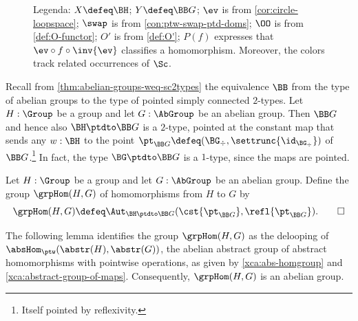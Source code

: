 \def\Scc{\inred{\Sc}}
\begin{figure}[h]
  \caption{\label{fig:bjørn}
  Legenda:
  $X\defeq\BH$;
  $Y\defeq\protect\BB G$;
  $\protect\ev$ is from \cref{cor:circle-loopspace};
  $\swap$ is from \cref{con:ptw-swap-ptd-doms};
  $\protect\OO$ is from \cref{def:O-functor};
  $O'$ is from \cref{def:O'};
  $P(f)$ expresses that $\protect\ev\circ f\circ \inv{\protect\ev}$
  classifies a homomorphism.
  Moreover, the colors track
  related occurrences of $\Sc$.
  }
\end{figure}

Recall from \cref{thm:abelian-groups-weq-sc2types} the equivalence
$\BB$ from the type of abelian groups to the type of pointed
simply connected $2$-types. Let $H:\Group$ be a group and let
$G:\AbGroup$ be an abelian group.
Then $\BB G$ and hence also $\BH\ptdto\BB G$ is a $2$-type, 
pointed at the constant map that sends any $w:\BH$ to the 
point $\pt_{\BB G}\defeq (\BG_\div,\settrunc{\id_{\BG_\div}})$ 
of $\BB G$.\footnote{Itself pointed by reflexivity.} In fact,
the type $\BG\ptdto\BB G$ is a $1$-type, since the maps are pointed.

\begin{definition}\label{def:AbHomgroup}
Let $H:\Group$ be a group and let $G:\AbGroup$ be an abelian group. 
Define the group $\grpHom(H,G)$ of homomorphisms from $H$ to $G$ by 
\[
\grpHom(H,G) \defeq \Aut_{\BH\ptdto\BB G}
(\cst{\pt_{\BB G}},\refl{\pt_{\BB G}}).\qedhere
\]
\end{definition}

The following lemma identifies the group $\grpHom(H,G)$ as the 
delooping of $\absHom_{\ptw}(\abstr(H),\abstr(G))$, 
the abelian abstract group of abstract homomorphisms with
pointwise operations, as given by
\cref{xca:abs-homgroup} and \cref{xca:abstract-group-of-maps}.
Consequently, $\grpHom(H,G)$ is an abelian group.


